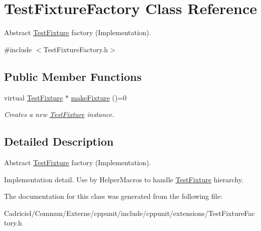 \hypertarget{class_test_fixture_factory}{}\section{Test\+Fixture\+Factory Class Reference}
\label{class_test_fixture_factory}


Abstract \hyperlink{class_test_fixture}{Test\+Fixture} factory (Implementation).  




{\ttfamily \#include $<$Test\+Fixture\+Factory.\+h$>$}

\subsection*{Public Member Functions}
\begin{DoxyCompactItemize}
\item 
virtual \hyperlink{class_test_fixture}{Test\+Fixture} $\ast$ \hyperlink{class_test_fixture_factory_a50ae33b88d818ef819478e47929a820c}{make\+Fixture} ()=0\hypertarget{class_test_fixture_factory_a50ae33b88d818ef819478e47929a820c}{}\label{class_test_fixture_factory_a50ae33b88d818ef819478e47929a820c}

\begin{DoxyCompactList}\small\item\em Creates a new \hyperlink{class_test_fixture}{Test\+Fixture} instance. \end{DoxyCompactList}\end{DoxyCompactItemize}


\subsection{Detailed Description}
Abstract \hyperlink{class_test_fixture}{Test\+Fixture} factory (Implementation). 

Implementation detail. Use by Helper\+Macros to handle \hyperlink{class_test_fixture}{Test\+Fixture} hierarchy. 

The documentation for this class was generated from the following file\+:\begin{DoxyCompactItemize}
\item 
Cadriciel/\+Commun/\+Externe/cppunit/include/cppunit/extensions/Test\+Fixture\+Factory.\+h\end{DoxyCompactItemize}
